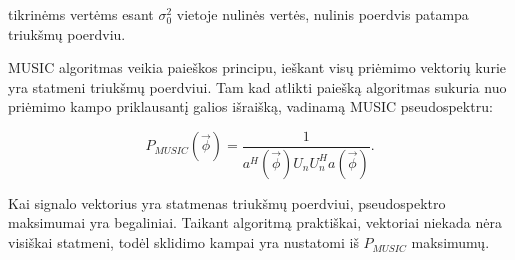 \documentclass[main.tex]{subfiles}
\begin{document}
\noindent tikrinėms vertėms esant $\sigma^2_0$ vietoje nulinės vertės, nulinis
poerdvis patampa triukšmų poerdviu.

MUSIC algoritmas veikia paieškos principu, ieškant visų priėmimo vektorių kurie
yra statmeni triukšmų poerdviui. Tam kad atlikti paiešką algoritmas sukuria
nuo priėmimo kampo priklausantį galios išraišką, vadinamą MUSIC pseudospektru:

\begin{equation}
    P_{MUSIC}(\overrightarrow{\phi}) = \frac{1}{a^H(\overrightarrow{\phi})U_nU_n^Ha(\overrightarrow{\phi})}.
\end{equation}

\noindent Kai signalo vektorius yra statmenas triukšmų poerdviui, pseudospektro maksimumai
yra begaliniai. Taikant algoritmą praktiškai, vektoriai niekada nėra visiškai statmeni,
todėl sklidimo kampai yra nustatomi iš $P_{MUSIC}$ maksimumų.
\end{document}
